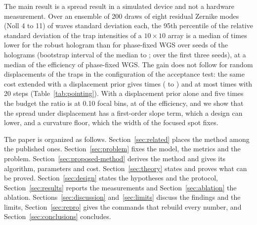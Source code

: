 The main result is a spread result in a simulated device and not a hardware measurement. Over an ensemble of 200 draws of eight residual Zernike modes (Noll 4 to 11) of \parAb{} waves standard deviation each, the 95th percentile of the
relative standard deviation of the trap intensities of a $10\times10$ array is a median of \ratioHeadAll{} times lower for the robust hologram than for phase-fixed WGS over \ratioHeadAllN{} seeds of the holograms (bootstrap interval of the median \ratioAllCiLo{} to \ratioAllCiHi; \ratioHeadThree{} over the first three seeds), at a median \effAllMed{} of the efficiency of phase-fixed WGS. The gain does not follow for random displacements of the traps in the configuration of the acceptance test: the same cost
extended with a displacement prior gives \ptAccMed{} times (\ptAccMin{} to \ptAccMax) and at most \ptASampleMax{} times with 20 steps (Table~\ref{tab:pointing}). With a displacement prior alone and five times the budget the ratio is \poBLong{} at 0.10 focal bins, at \poBLongEff{} of the efficiency, and we show that the spread under displacement has a first-order
slope term, which a design can lower, and a curvature floor, which the width of the focused spot fixes.

The paper is organized as follows. Section~\ref{sec:related} places the method among the published ones. Section~\ref{sec:problem} fixes the model, the metrics and the problem. Section~\ref{sec:proposed-method} derives the method and
gives its algorithm, parameters and cost. Section~\ref{sec:theory} states and proves what can be proved. Section~\ref{sec:design} states the hypotheses and the protocol, Section~\ref{sec:results} reports the measurements and
Section~\ref{sec:ablation} the ablation. Sections~\ref{sec:discussion} and~\ref{sec:limits} discuss the findings and the limits, Section~\ref{sec:repro} gives the commands that rebuild every number, and
Section~\ref{sec:conclusions} concludes.
